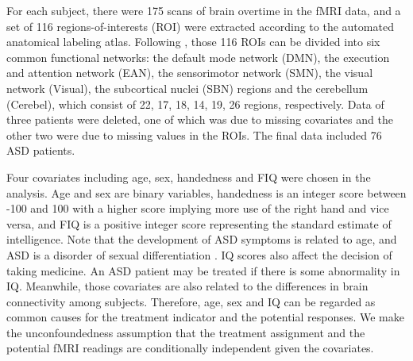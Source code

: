 \documentclass[12pt]{article}
\theoremstyle{definition}
\begin{document}
For each subject, there were 175 scans of brain overtime in the fMRI data, and  
a set of 116 regions-of-interests (ROI) were extracted according to the automated anatomical labeling atlas. 
Following 
\cite{liu2020alterations}, those 116 ROIs can be divided into six common functional networks: the default mode network (DMN), the execution and attention network (EAN), the sensorimotor network (SMN), the visual network (Visual), the subcortical nuclei (SBN) regions and the cerebellum (Cerebel), which consist of 22, 17, 18, 14, 19, 26 regions, respectively. Data of three patients were deleted, one of which was due to missing covariates and the other two were due to missing values in the ROIs. The final data included 76 ASD patients. 

Four covariates including age, sex, handedness and FIQ were chosen in the analysis. Age and sex are binary variables, handedness is an integer score between -100 and 100 with a higher score implying more use of the right hand and vice versa, and FIQ is a positive integer score representing the standard estimate of intelligence. 
Note that the development of ASD symptoms is related to age, and ASD is a disorder of sexual differentiation \citep{alaerts2016sex}. 
IQ scores also affect the decision of taking medicine. An ASD patient may be treated if there is some abnormality in IQ. Meanwhile, those covariates are also related to the differences in brain connectivity among subjects. 
Therefore, age, sex and IQ can be regarded as common causes for the treatment indicator and the potential responses.
We make the unconfoundedness assumption that the treatment assignment and the potential fMRI readings are conditionally independent given the covariates. 
\end{document}
